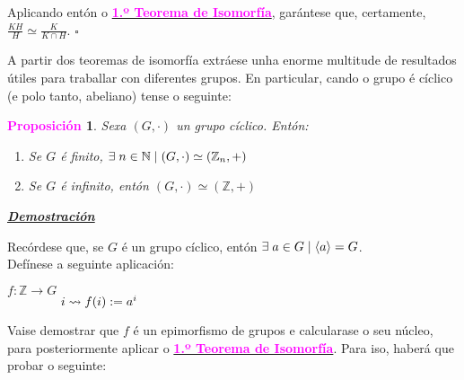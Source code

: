 \documentclass[twoside]{report}
\newcommand{\magbf}[1]{\textcolor{magenta}{\textbf{#1}}} %
\theoremstyle{mystyle}
\newtheorem{prop}{\magbf{Proposición}}[chapter]
\newenvironment{proposition}
{\begin{mdframed}[linecolor = magenta,backgroundcolor = classicrose, linewidth = 2mm]\begin{prop}}
{\end{prop}\end{mdframed}}
\begin{document}
\noindent Aplicando entón o \hyperref[th1.5]{\magbf{1.º Teorema de Isomorfía}}, garántese que, certamente, $\displaystyle \frac{KH}{H} \simeq \displaystyle \frac{K}{K \cap H}$. $\square$ \pagebreak

\noindent A partir dos teoremas de isomorfía extráese unha enorme multitude de resultados útiles para traballar con diferentes grupos. En particular, cando o grupo é cíclico (e polo tanto, abeliano) tense o seguinte: \\

\begin{proposition} \label{prop1.9}
Sexa $(G, \cdot)$ un grupo cíclico. Entón:
\begin{enumerate}
    \item Se $G$ é finito, $\exists \hspace{1mm} n \in \mathbb{N} \hspace{1mm} | \hspace{1mm} (G, \cdot) \simeq (\mathbb{Z}_{n}, +)$
    \item Se $G$ é infinito, entón $(G, \cdot) \simeq (\mathbb{Z}, +)$
\end{enumerate}
\end{proposition}

\vspace{2mm}

\noindent \textbf{\textit{\underline{Demostración}}}

\vspace{2mm}

\noindent Recórdese que, se $G$ é un grupo cíclico, entón $\exists \hspace{1mm} a \in G \hspace{1mm} | \hspace{1mm} \langle a \rangle = G$. \\

\noindent Defínese a seguinte aplicación:

    \begin{center}
            $f: \mathbb{Z} \longrightarrow G$ \\
        \vspace{2mm}
        $\hspace{15mm} i \leadsto f(i) := a^{i}$
    \end{center} 
    
\noindent Vaise demostrar que $f$ é un epimorfismo de grupos e calcularase o seu núcleo, para posteriormente aplicar o \hyperref[th1.5]{\magbf{1.º Teorema de Isomorfía}}. Para iso, haberá que probar o seguinte:
\end{document}
